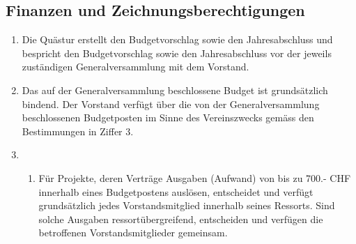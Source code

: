 \subsection{Finanzen und Zeichnungsberechtigungen}
\begin{enumerate}
  \item Die Quästur erstellt den Budgetvorschlag sowie den Jahresabschluss und bespricht den Budgetvorschlag sowie den Jahresabschluss vor der jeweils zuständigen Generalversammlung mit dem Vorstand.
  \item Das auf der Generalversammlung beschlossene Budget ist grundsätzlich bindend. Der Vorstand verfügt über die von der Generalversammlung beschlossenen Budgetposten im Sinne des Vereinszwecks gemäss den Bestimmungen in Ziffer 3.
  \item 
    \begin{enumerate}
      \item Für Projekte, deren Verträge Ausgaben (Aufwand) von bis zu 700.- CHF innerhalb eines Budgetpostens auslösen, entscheidet und verfügt grundsätzlich jedes Vorstandsmitglied innerhalb seines Ressorts. Sind solche Ausgaben ressortübergreifend, entscheiden und verfügen die betroffenen Vorstandsmitglieder gemeinsam.


\end{enumerate}
\end{enumerate}
